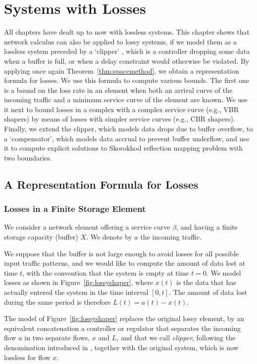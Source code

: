 \chapter{Systems with Losses}

All chapters have dealt up to now with lossless systems. This
chapter shows that network calculus can also be applied to lossy
systems, if we model them as a lossless system preceded by a
`clipper' \cite{CCLBT,CruzTaneja}, which is a controller dropping
some data when a buffer is full, or when a delay constraint would
otherwise be violated. By applying once again
Theorem~\ref{thm:spacemethod}, we obtain a representation formula
for losses. We use this formula to compute various bounds. The
first one is a bound on the loss rate in an element when both an
arrival curve of the incoming traffic and a minimum service curve
of the element are known. We use it next to bound losses in a
complex with a complex service curve (e.g., VBR shapers) by means
of losses with simpler service curves (e.g., CBR shapers).
Finally, we extend the clipper, which models data drops due to
buffer overflow, to a `compensator', which models data accrual to
prevent buffer underflow, and use it to compute explicit solutions
to Skorokhod reflection mapping problem with two boundaries.

\section{A Representation Formula for Losses}

\subsection{Losses in a Finite Storage Element}

We consider a network element offering a service curve $\beta$, and having a finite storage capacity (buffer) $X$. We denote by $a$ the incoming traffic.

We suppose that the buffer is not large enough to avoid losses for
all possible input traffic patterns,
and we would like to compute the amount of data lost at time $t$,
with the convention that
the system is empty at time $t=0$. We model losses as shown in
Figure~\ref{fig:lossyshaper}, where
$x(t)$ is the data that has actually entered the system in the time
interval $[0,t]$.
The amount of data lost during the same period is therefore $L(t) = a(t) - x(t)$.

The model of Figure~\ref{fig:lossyshaper} replaces the original
lossy element, by an equivalent concatenation a controller or
regulator that separates the incoming flow $a$ in two separate
flows, $x$ and $L$, and that we call {\em clipper}, following the
denomination introduced in \cite{CruzTaneja}, together with the
original system, which is now lossless for flow $x$.

